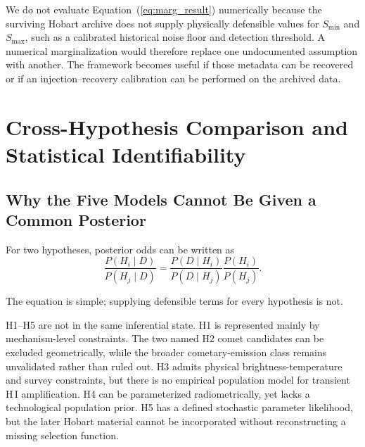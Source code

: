 \documentclass[crop]{CSL}
\begin{document}
We do not evaluate Equation~(\ref{eq:marg_result}) numerically because the surviving Hobart archive does not supply physically defensible values for $S_{\min}$ and $S_{\max}$, such as a calibrated historical noise floor and detection threshold. A numerical marginalization would therefore replace one undocumented assumption with another. The framework becomes useful if those metadata can be recovered or if an injection--recovery calibration can be performed on the archived data.


\section{Cross-Hypothesis Comparison and Statistical Identifiability}
\label{sec:comparison}

\subsection{Why the Five Models Cannot Be Given a Common Posterior}

For two hypotheses, posterior odds can be written as
\begin{equation}
\frac{P(H_i\mid D)}{P(H_j\mid D)}
=
\frac{P(D\mid H_i)}{P(D\mid H_j)}
\frac{P(H_i)}{P(H_j)}.
\label{eq:odds}
\end{equation}

The equation is simple; supplying defensible terms for every hypothesis is not.

H1--H5 are not in the same inferential state. H1 is represented mainly by mechanism-level constraints. The two named H2 comet candidates can be excluded geometrically, while the broader cometary-emission class remains unvalidated rather than ruled out. H3 admits physical brightness-temperature and survey constraints, but there is no empirical population model for transient H\,I amplification. H4 can be parameterized radiometrically, yet lacks a technological population prior. H5 has a defined stochastic parameter likelihood, but the later Hobart material cannot be incorporated without reconstructing a missing selection function.
\end{document}
